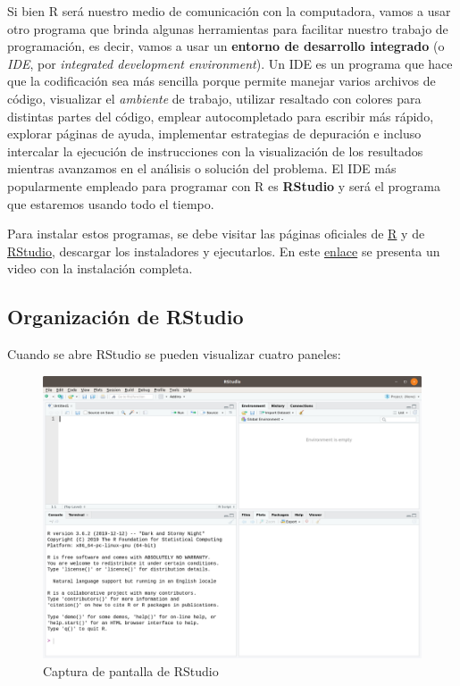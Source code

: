 \documentclass[
]{book}
\begin{document}
Si bien R será nuestro medio de comunicación con la computadora, vamos a usar otro programa que brinda algunas herramientas para facilitar nuestro trabajo de programación, es decir, vamos a usar un \textbf{entorno de desarrollo integrado} (o \emph{IDE}, por \emph{integrated development environment}). Un IDE es un programa que hace que la codificación sea más sencilla porque permite manejar varios archivos de código, visualizar el \emph{ambiente} de trabajo, utilizar resaltado con colores para distintas partes del código, emplear autocompletado para escribir más rápido, explorar páginas de ayuda, implementar estrategias de depuración e incluso intercalar la ejecución de instrucciones con la visualización de los resultados mientras avanzamos en el análisis o solución del problema. El IDE más popularmente empleado para programar con R es \textbf{RStudio} y será el programa que estaremos usando todo el tiempo.

Para instalar estos programas, se debe visitar las páginas oficiales de \href{https://www.r-project.org/}{R} y de \href{https://www.rstudio.org/}{RStudio}, descargar los instaladores y ejecutarlos. En este \href{https://www.youtube.com/watch?v=D9Bp11iZssc}{enlace} se presenta un video con la instalación completa.

\hypertarget{organizaciuxf3n-de-rstudio}{%
\subsection{Organización de RStudio}\label{organizaciuxf3n-de-rstudio}}

Cuando se abre RStudio se pueden visualizar cuatro paneles:

\begin{figure}

{\centering \includegraphics[width=1\linewidth]{images/intro/12_AbrirRStudio} 

}

\caption{Captura de pantalla de RStudio}\label{fig:unnamed-chunk-10}
\end{figure}
\end{document}
